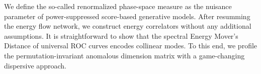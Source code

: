 We define the so-called renormalized phase-space measure as the nuisance
parameter of power-suppressed score-based generative models. After
resumming the energy flow network, we construct energy correlators
without any additional assumptions. It is straightforward to show that
the spectral Energy Mover's Distance of universal ROC curves encodes
collinear modes. To this end, we profile the permutation-invariant
anomalous dimension matrix with a game-changing dispersive approach.

